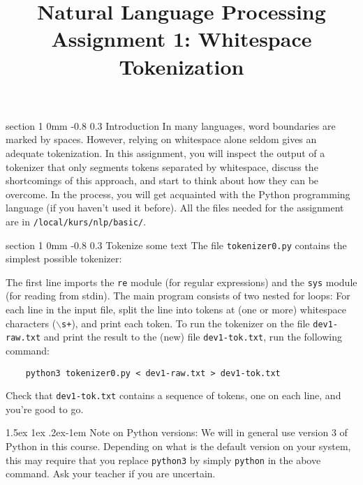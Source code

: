 \documentclass[11pt]{article}
\title{{\LARGE Natural Language Processing}\\[1.5mm]{\large Assignment 1: Whitespace Tokenization}}
\author{}
\date{} %
\makeatletter
\newcommand{\newsec}[2]{\section{#1}\label{sec:#2}\noindent}
\renewcommand{\section}{\@startsection
{section}%
{1}%
{0mm}%
{-0.8\baselineskip}%
{0.3\baselineskip}%
{\bfseries\large}}%
\renewcommand{\paragraph}{%
  \@startsection{paragraph}{4}%
  {\z@}{1.5ex \@plus 1ex \@minus .2ex}{-1em}%
  {\normalfont\normalsize\bfseries}%
}\makeatother
\makeatother
\begin{document}
 

\maketitle
\vspace{-2mm}
\newsec{Introduction}{intro}%
In many languages, word boundaries are marked by spaces. However, relying on whitespace alone seldom gives an adequate tokenization. In this assignment, you will 
inspect the output of a tokenizer that only segments tokens separated by whitespace, discuss the shortcomings of this approach, and start to think about how they
can be overcome. In the process, you will get acquainted with the Python programming language (if you haven't used it before).
All the files needed for the assignment are in {\tt /local/kurs/nlp/basic/}.

\newsec{Tokenize some text}{tokenize}%
The file {\tt tokenizer0.py} contains the simplest possible tokenizer:
\begin{center}
\fbox{

}
\end{center}
The first line imports the {\tt re} module (for regular expressions) and the {\tt sys} module (for reading from stdin). The main program consists of two nested for loops: 
For each line in the input file, split the line into tokens at (one or more) whitespace characters ({\tt {$\backslash$}s+}), and print each token.
To run the tokenizer on the file {\tt dev1-raw.txt} and print the result to the (new) file {\tt dev1-tok.txt}, run the following command:
\begin{verbatim}
    python3 tokenizer0.py < dev1-raw.txt > dev1-tok.txt
\end{verbatim}
Check that {\tt dev1-tok.txt} contains a sequence of tokens, one on each line, and you're good to go.

\paragraph{Note on Python versions:} 
We will in general use version 3 of Python in this course. 
Depending on what is the default version on your system, this may require that you replace {\tt python3} by simply {\tt python} in the above command. 
Ask your teacher if you are uncertain.
\end{document}
